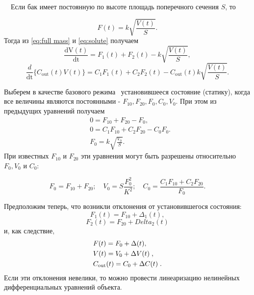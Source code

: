 		\ \ Если бак имеет постоянную по высоте площадь поперечного сечения  $S$, то

\begin{equation}\label{eq:buck}
 F(t)=k\sqrt{\frac{V(t)} S}. %
\end{equation}
		Тогда из \eqref{eq:full mass} %
		и \eqref{eq:solute} %
		получаем
\begin{equation*}
\frac{\text{dV}(t)}{\text{dt}}=F_1(t)+F_2(t)-k\sqrt{\frac{V(t)} S},
\end{equation*}
\begin{equation*}
\frac
d{\text{dt}}\{C_{\text{out}}(t)V(t)\}=C_1F_1(t)+C_2F_2(t)-C_{\text{out}}(t)k\sqrt{\frac{V(t)}
	S}.
\end{equation*}

		Выберем в качестве базового режима \ установившееся состояние (статику), когда все величины являются постоянными - 
		$F_{10},F_{20},F_0,C_0,V_0$. При этом из предыдущих уравнений получаем
\begin{align*}
		&0=F_{10}+F_{20}-F_0,\\
		&0=C_1F_{10}+C_2F_{20}-C_0F_0.\\
		&F_0=k\sqrt{\frac{V_0} S}.
\end{align*}
		При известных $F_{10}$ и  $F_{20}$ эти уравнения могут быть разрешены относительно  $F_0,V_0$ и $C_0$:
		
\begin{equation*}
		F_0=F_{10}+F_{20};\quad V_0=S\frac{F_0^2}{K^2};\quad C_0=\frac{C_1F_{10}+C_2F_{20}}{F_0}.
\end{equation*}



		Предположим теперь, что возникли отклонения от установившегося состояния:
\begin{equation*}
		 F_1(t)=F_{10}+\Delta_1(t),
\end{equation*}
\begin{equation*}
	F_2(t)=F_{20}+Delta_2(t)
\end{equation*}
 и, как следствие,
\begin{align*}
	&F(t)=F_0+\Delta  (t),\\
	&V(t)=V_0+\Delta V(t)\;,\\
	&C_{\normalsubformula{\text{out}}}(t)=C_0+\Delta C(t)\;.
\end{align*}
		Если эти отклонения невелики, то можно провести линеаризацию нелинейных дифференциальных уравнений объекта.



